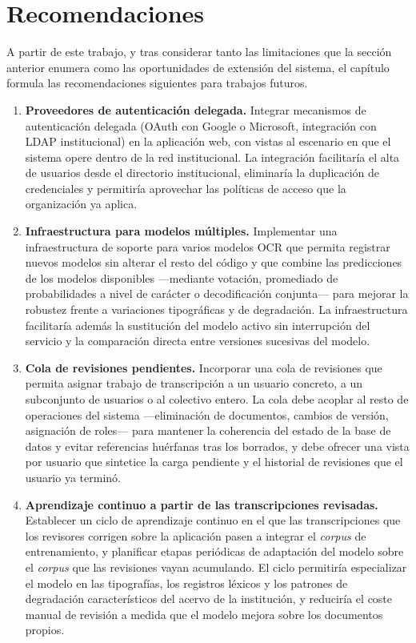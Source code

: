 \chapter*{Recomendaciones}
\label{chap:recommendations}

A partir de este trabajo, y tras considerar tanto las limitaciones que la sección anterior enumera como las oportunidades de extensión del sistema, el capítulo formula las recomendaciones siguientes para trabajos futuros.

\begin{enumerate}[leftmargin=*,labelsep=0.5em]
	\item \textbf{Proveedores de autenticación delegada.} Integrar mecanismos de autenticación delegada (OAuth con Google o Microsoft, integración con LDAP institucional) en la aplicación web, con vistas al escenario en que el sistema opere dentro de la red institucional. La integración facilitaría el alta de usuarios desde el directorio institucional, eliminaría la duplicación de credenciales y permitiría aprovechar las políticas de acceso que la organización ya aplica.
	
	\item \textbf{Infraestructura para modelos múltiples.} Implementar una infraestructura de soporte para varios modelos OCR que permita registrar nuevos modelos sin alterar el resto del código y que combine las predicciones de los modelos disponibles —mediante votación, promediado de probabilidades a nivel de carácter o decodificación conjunta— para mejorar la robustez frente a variaciones tipográficas y de degradación. La infraestructura facilitaría además la sustitución del modelo activo sin interrupción del servicio y la comparación directa entre versiones sucesivas del modelo.
	
	\item \textbf{Cola de revisiones pendientes.} Incorporar una cola de revisiones que permita asignar trabajo de transcripción a un usuario concreto, a un subconjunto de usuarios o al colectivo entero. La cola debe acoplar al resto de operaciones del sistema —eliminación de documentos, cambios de versión, asignación de roles— para mantener la coherencia del estado de la base de datos y evitar referencias huérfanas tras los borrados, y debe ofrecer una vista por usuario que sintetice la carga pendiente y el historial de revisiones que el usuario ya terminó.
	
	\item \textbf{Aprendizaje continuo a partir de las transcripciones revisadas.} Establecer un ciclo de aprendizaje continuo en el que las transcripciones que los revisores corrigen sobre la aplicación pasen a integrar el \textit{corpus} de entrenamiento, y planificar etapas periódicas de adaptación del modelo sobre el \textit{corpus} que las revisiones vayan acumulando. El ciclo permitiría especializar el modelo en las tipografías, los registros léxicos y los patrones de degradación característicos del acervo de la institución, y reduciría el coste manual de revisión a medida que el modelo mejora sobre los documentos propios.
	

\end{enumerate}
